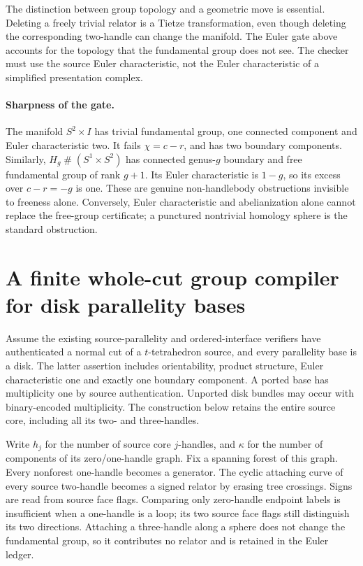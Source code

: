 The distinction between group topology and a geometric move is essential.
Deleting a freely trivial relator is a Tietze transformation, even though
deleting the corresponding two-handle can change the manifold.  The
Euler gate above accounts for the topology that the fundamental group
does not see.  The checker must use the source Euler characteristic, not
the Euler characteristic of a simplified presentation complex.

\paragraph{Sharpness of the gate.}
The manifold $S^2\times I$ has trivial fundamental group, one connected
component and Euler characteristic two.  It fails $\chi=c-r$, and has
two boundary components.  Similarly,
$H_g\mathbin{\#}(S^1\times S^2)$ has connected genus-$g$ boundary and
free fundamental group of rank $g+1$.  Its Euler characteristic is
$1-g$, so its excess over $c-r=-g$ is one.  These are genuine
non-handlebody obstructions invisible to freeness alone.  Conversely,
Euler characteristic and abelianization alone cannot replace the
free-group certificate; a punctured nontrivial homology sphere is the
standard obstruction.

\section{A finite whole-cut group compiler for disk parallelity bases}
\label{sec:disk-group-compiler}

Assume the existing source-parallelity and ordered-interface verifiers
have authenticated a normal cut of a $t$-tetrahedron source, and every
parallelity base is a disk.  The latter assertion includes orientability,
product structure, Euler characteristic one and exactly one boundary
component.  A ported base has multiplicity one by source authentication.
Unported disk bundles may occur with binary-encoded multiplicity.  The
construction below retains the entire source core, including all its
two- and three-handles.

Write $h_j$ for the number of source core $j$-handles, and $\kappa$ for
the number of components of its zero/one-handle graph.  Fix a spanning
forest of this graph.  Every nonforest one-handle becomes a generator.
The cyclic attaching curve of every source two-handle becomes a signed
relator by erasing tree crossings.  Signs are read from source face
flags.  Comparing only zero-handle endpoint labels is insufficient when
a one-handle is a loop; its two source face flags still distinguish its
two directions.  Attaching a three-handle along a sphere does not change
the fundamental group, so it contributes no relator and is retained in
the Euler ledger.

